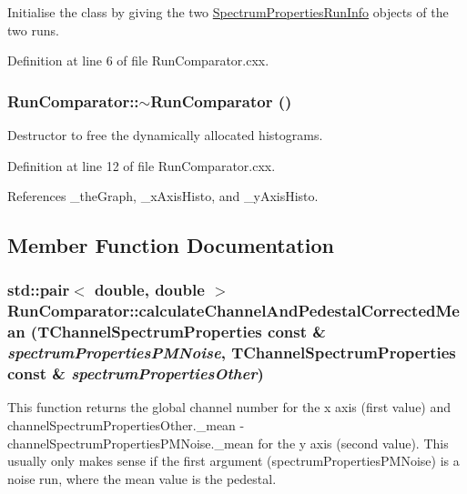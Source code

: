 Initialise the class by giving the two \hyperlink{class_spectrum_properties_run_info}{SpectrumPropertiesRunInfo} objects of the two runs. 

Definition at line 6 of file RunComparator.cxx.\hypertarget{class_run_comparator_a6df76f47b1cd9e6da5615814f3f631c5}{
\subsubsection[{$\sim$RunComparator}]{\setlength{\rightskip}{0pt plus 5cm}RunComparator::$\sim$RunComparator ()}}
\label{class_run_comparator_a6df76f47b1cd9e6da5615814f3f631c5}


Destructor to free the dynamically allocated histograms. 

Definition at line 12 of file RunComparator.cxx.

References \_\-theGraph, \_\-xAxisHisto, and \_\-yAxisHisto.

\subsection{Member Function Documentation}
\hypertarget{class_run_comparator_a7e9217ea3aff2f7f2b94760b8df8884a}{
\subsubsection[{calculateChannelAndPedestalCorrectedMean}]{\setlength{\rightskip}{0pt plus 5cm}std::pair$<$ double, double $>$ RunComparator::calculateChannelAndPedestalCorrectedMean ({\bf TChannelSpectrumProperties} const \& {\em spectrumPropertiesPMNoise}, \/  {\bf TChannelSpectrumProperties} const \& {\em spectrumPropertiesOther})}}
\label{class_run_comparator_a7e9217ea3aff2f7f2b94760b8df8884a}


This function returns the global channel number for the x axis (first value) and {\ttfamily channelSpectrumPropertiesOther.\_\-mean} -\/ {\ttfamily channelSpectrumPropertiesPMNoise.\_\-mean} for the y axis (second value). This usually only makes sense if the first argument ({\ttfamily spectrumPropertiesPMNoise}) is a noise run, where the mean value is the pedestal. 

